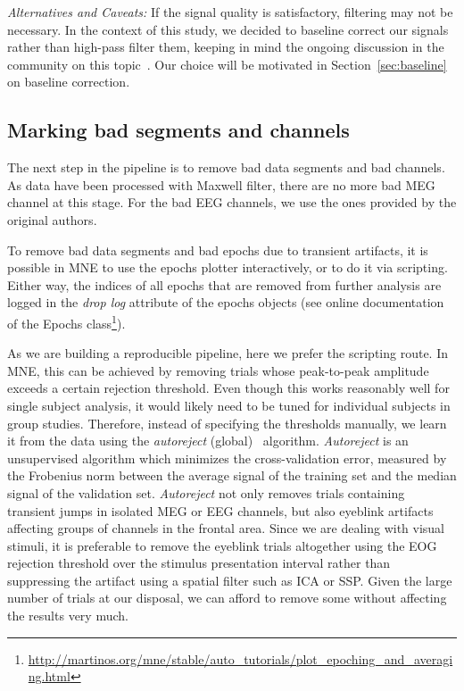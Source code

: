 \emph{Alternatives and Caveats:} If the signal quality is satisfactory, filtering may not be necessary. In the context of this study, we decided to baseline correct our signals rather than high-pass filter them, keeping in mind the ongoing discussion in the community on this topic~\citep{tanner2015inappropriate,rousselet2012does,widmann2012filter,acunzo2012systematic,maess2016high}. Our choice will be motivated in Section~\ref{sec:baseline} on baseline correction.

\subsection{Marking bad segments and channels}

The next step in the pipeline is to remove bad data segments and bad channels. As data have been processed with Maxwell filter, there are no more bad MEG channel at this stage. For the bad EEG channels, we use the ones provided by the original authors.

To remove bad data segments and bad epochs due to transient artifacts, it is possible in MNE to use the epochs plotter interactively, or to do it via scripting. Either way, the indices of all epochs that are removed from further analysis are logged in the \textit{drop log} attribute of the epochs objects (see online documentation of the Epochs class\footnote{\url{http://martinos.org/mne/stable/auto_tutorials/plot_epoching_and_averaging.html}}).

As we are building a reproducible pipeline, here we prefer the scripting route. In MNE, this can be achieved by removing trials whose peak-to-peak amplitude exceeds a certain rejection threshold. Even though this works reasonably well for single subject analysis, it would likely need to be tuned for individual subjects in group studies. Therefore, instead of specifying the thresholds manually, we learn it from the data using the \emph{autoreject} (global)~\citep{jas2016autoreject} algorithm. \emph{Autoreject} is an unsupervised algorithm which minimizes the cross-validation error, measured by the Frobenius norm between the average signal of the training set and the median signal of the validation set. \emph{Autoreject} not only removes trials containing transient jumps in isolated MEG or EEG channels, but also eyeblink artifacts affecting groups of channels in the frontal area. Since we are dealing with visual stimuli, it is preferable to remove the eyeblink trials altogether using the EOG rejection threshold over the stimulus presentation interval rather than suppressing the artifact using a spatial filter such as ICA or SSP. Given the large number of trials at our disposal, we can afford to remove some without affecting the results very much.

